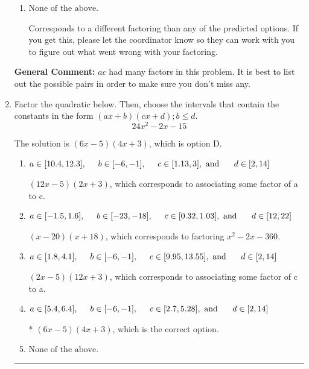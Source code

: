\documentclass{extbook}[14pt]
\newcommand{\litem}[1]{\item #1

\rule{\textwidth}{0.4pt}}
\begin{document}
\begin{enumerate}
{\begin{enumerate}[label=\Alph*.]
 $(2x -3)(12x + 5)$, which corresponds to associating some factor of c to a.
\item \( \text{None of the above.} \)

 Corresponds to a different factoring than any of the predicted options. If you get this, please let the coordinator know so they can work with you to figure out what went wrong with your factoring.
\end{enumerate}

\textbf{General Comment:} $ac$ had many factors in this problem. It is best to list out the possible pairs in order to make sure you don't miss any.
}
\litem{
Factor the quadratic below. Then, choose the intervals that contain the constants in the form $(ax+b)(cx+d); b \leq d.$
\[ 24x^{2} -2 x -15 \]

The solution is \( (6x -5)(4x + 3) \), which is option D.\begin{enumerate}[label=\Alph*.]
\item \( a \in [10.4, 12.3], \hspace*{5mm} b \in [-6, -1], \hspace*{5mm} c \in [1.13, 3], \text{ and } \hspace*{5mm} d \in [2, 14] \)

 $(12x -5)(2x + 3)$, which corresponds to associating some factor of a to c.
\item \( a \in [-1.5, 1.6], \hspace*{5mm} b \in [-23, -18], \hspace*{5mm} c \in [0.32, 1.03], \text{ and } \hspace*{5mm} d \in [12, 22] \)

 $(x -20)(x + 18)$, which corresponds to factoring $x^{2} -2 x -360$.
\item \( a \in [1.8, 4.1], \hspace*{5mm} b \in [-6, -1], \hspace*{5mm} c \in [9.95, 13.55], \text{ and } \hspace*{5mm} d \in [2, 14] \)

 $(2x -5)(12x + 3)$, which corresponds to associating some factor of c to a.
\item \( a \in [5.4, 6.4], \hspace*{5mm} b \in [-6, -1], \hspace*{5mm} c \in [2.7, 5.28], \text{ and } \hspace*{5mm} d \in [2, 14] \)

* $(6x -5)(4x + 3)$, which is the correct option.
\item \( \text{None of the above.} \)


\end{enumerate}}
\end{enumerate}
\end{document}
